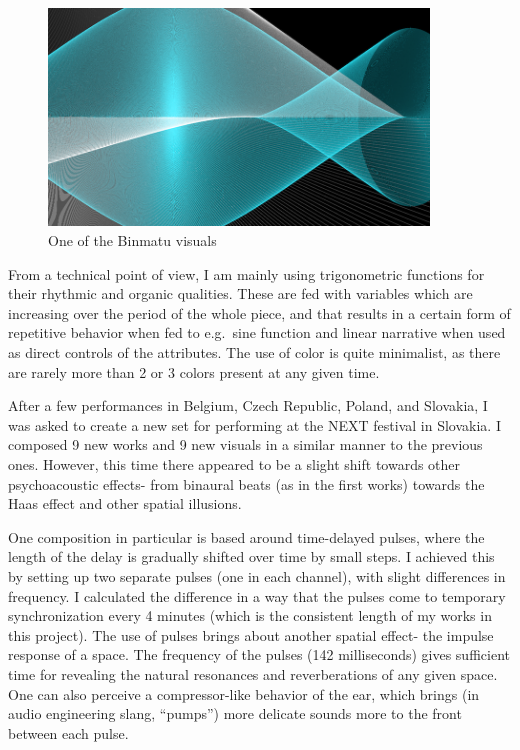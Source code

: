 \documentclass[12pt,a4paper,oneside]{report}
\begin{document}
\begin{figure}  
  \centering
    \includegraphics[width=0.9\textwidth]{img/binmatu}
        \caption{One of the Binmatu visuals}
        \label{fig:binmatu}
\end{figure}

From a technical point of view, I am mainly using trigonometric functions for their rhythmic and organic qualities. These are fed with variables which are increasing over the period of the whole piece, and that results in a certain form of repetitive behavior when fed to e.g.\ sine function and linear narrative when used as direct controls of the attributes. The use of color is quite minimalist, as there are rarely more than 2 or 3 colors present at any given time.

After a few performances in Belgium, Czech Republic, Poland, and Slovakia, I was asked to create a new set for performing at the NEXT festival in Slovakia. I composed 9 new works and 9 new visuals in a similar manner to the previous ones. However, this time there appeared to be a slight shift towards other psychoacoustic effects- from binaural beats (as in the first works) towards the Haas effect and other spatial illusions.

One composition in particular is based around time-delayed pulses, where the length of the delay is gradually shifted over time by small steps. I achieved this by setting up two separate pulses (one in each channel), with slight differences in frequency. I calculated the difference in a way that the pulses come to temporary synchronization every 4 minutes (which is the consistent length of my works in this project). The use of pulses brings about another spatial effect- the impulse response of a space. The frequency of the pulses (142 milliseconds) gives sufficient time for revealing the natural resonances and reverberations of any given space. One can also perceive a compressor-like behavior of the ear, which brings (in audio engineering slang, ``pumps'') more delicate sounds more to the front between each pulse.
\end{document}
